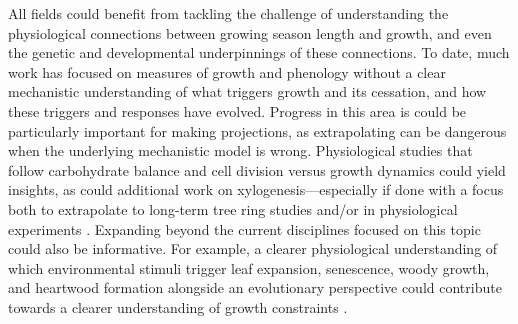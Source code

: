 \documentclass[11pt]{article}
\begin{document}
All fields could benefit from tackling the challenge of understanding the physiological connections between growing season length and growth, and even the genetic and developmental underpinnings of these connections. To date, much work has focused on measures of growth and phenology without a clear mechanistic understanding of what triggers growth and its cessation, and how these triggers and responses have evolved.  %
Progress in this area is could be particularly important for making projections, as extrapolating can be dangerous when the underlying mechanistic model is wrong. Physiological studies that follow carbohydrate balance and cell division \citep[see][]{locosselli2017dendrobiochemistry} versus growth dynamics could yield insights, as could additional work on xylogenesis---especially if done with a focus both to extrapolate to long-term tree ring studies and/or in physiological experiments \citep{fang2020physiological,simard2013intra}. Expanding beyond the current disciplines focused on this topic could also be informative. For example, a clearer physiological understanding of which environmental stimuli trigger leaf expansion, senescence, woody growth, and heartwood formation alongside an evolutionary perspective could contribute towards a clearer understanding of growth
constraints \citep{baas2011wood,eckert2019makes,ensminger2015tree,juvany2013photo}.

\end{document}
